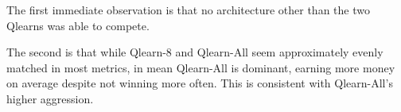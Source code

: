 The first immediate observation is that no architecture other than the two Qlearns was able to compete.

The second is that while Qlearn-8 and Qlearn-All seem approximately evenly matched in most metrics, in mean Qlearn-All is dominant, earning more money on average despite not winning more often. This is consistent with Qlearn-All's higher aggression.

\begin{figure}[H]
\centering
{}
\subcaptionbox{
}
\end{figure}
